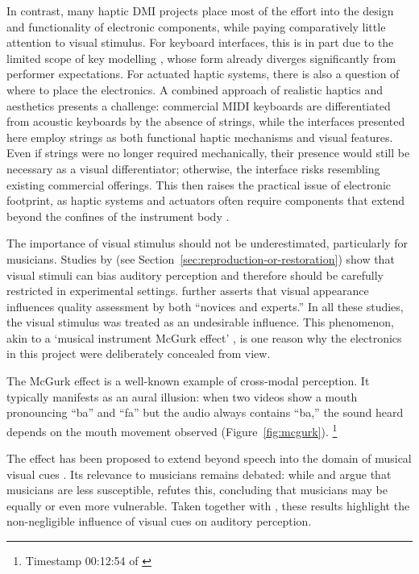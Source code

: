 In contrast, many haptic DMI projects place most of the effort into the design and functionality of electronic components, while paying comparatively little attention to visual stimulus. For keyboard interfaces, this is in part due to the limited scope of key modelling \cite{gillespie_haptic_1996,lozada_modelisations_2007,timmermans_multibody-based_2020}, whose form already diverges significantly from performer expectations. For actuated haptic systems, there is also a question of where to place the electronics. A combined approach of realistic haptics and aesthetics presents a challenge: commercial MIDI keyboards are differentiated from acoustic keyboards by the absence of strings, while the interfaces presented here employ strings as both functional haptic mechanisms and visual features. Even if strings were no longer required mechanically, their presence would still be necessary as a visual differentiator; otherwise, the interface risks resembling existing commercial offerings. This then raises the practical issue of electronic footprint, as haptic systems and actuators often require components that extend beyond the confines of the instrument body \cite{mcpherson_augmented_2010, schmidt_sparksichord_2025}.

The importance of visual stimulus should not be underestimated, particularly for musicians. Studies by \textcite{fritz_player_2012, fritz_soloist_2014, fritz_listener_2017} (see Section~\ref{sec:reproduction-or-restoration}) show that visual stimuli can bias auditory perception and therefore should be carefully restricted in experimental settings. \textcite{tsay_sight_2013} further asserts that visual appearance influences quality assessment by both ``novices and experts.'' In all these studies, the visual stimulus was treated as an undesirable influence. This phenomenon, akin to a `musical instrument McGurk effect' \cite{mcgurk_hearing_1976}, is one reason why the electronics in this project were deliberately concealed from view. 

The McGurk effect is a well-known example of cross-modal perception. It typically manifests as an aural illusion: when two videos show a mouth pronouncing ``ba'' and ``fa'' but the audio always contains ``ba,'' the sound heard depends on the mouth movement observed \cite{horizon_seeing_2010} (Figure~\ref{fig:mcgurk}). \footnote{Timestamp 00:12:54 of \textcite{horizon_seeing_2010}} 

The effect has been proposed to extend beyond speech into the domain of musical visual cues \cite{saidana_mcgurk_1990}. Its relevance to musicians remains debated: while \textcite{proverbio_skilled_2016} and \textcite{alsius_forty_2018} argue that musicians are less susceptible, \textcite{politzer_mcgurk_2019} refutes this, concluding that musicians may be equally or even more vulnerable. Taken together with \textcite{tsay_sight_2013, fritz_player_2012, fritz_soloist_2014, fritz_listener_2017}, these results highlight the non-negligible influence of visual cues on auditory perception.

